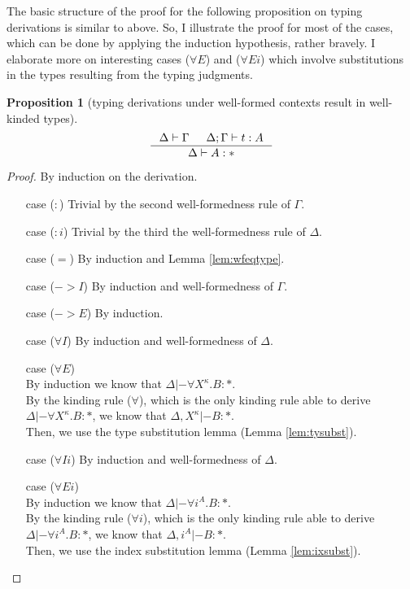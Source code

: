 \documentclass[preprint]{sigplanconf}
\theoremstyle{plain}
\newtheorem{proposition}{Proposition}
\theoremstyle{remark}
\theoremstyle{definition}
\begin{document}
The basic structure of the proof for the following proposition on typing
derivations is similar to above. So, I illustrate the proof for most of
the cases, which can be done by applying the induction hypothesis, rather
bravely. I elaborate more on interesting cases ($\forall E$) and ($\forall Ei$)
which involve substitutions in the types resulting from the typing judgments.
\begin{proposition}[typing derivations under well-formed contexts result in
	well-kinded types]
\label{prop:wftype}
\[ \inference{ \Delta |- \Gamma & \Delta;\Gamma |- t : A}{ \Delta |- A : * }
\]
\end{proposition}
\begin{proof} By induction on the derivation.
\begin{itemize}
\item[case] ($:$)
	Trivial by the second well-formedness rule of $\Gamma$.
\item[case] ($:i$)
	Trivial by the third the well-formedness rule of $\Delta$.
\item[case] ($=$)
	By induction and Lemma \ref{lem:wfeqtype}.
\item[case] ($->$$I$)
	By induction and well-formedness of $\Gamma$.
\item[case] ($->$$E$)
	By induction.
\item[case] ($\forall I$)
	By induction and well-formedness of $\Delta$.
\item[case] ($\forall E$)\\
	By induction we know that $\Delta |- \forall X^\kappa.B : *$.\\
	By the kinding rule ($\forall$), which is the only kinding rule
	able to derive $\Delta |- \forall X^\kappa.B : *$, we know
	that $\Delta,X^\kappa |- B : *$.\\
	Then, we use the type substitution lemma (Lemma \ref{lem:tysubst}).
\item[case] ($\forall Ii$)
	By induction and well-formedness of $\Delta$.
\item[case] ($\forall Ei$)\\
	By induction we know that $\Delta |- \forall i^A.B : *$.\\
	By the kinding rule ($\forall i$), which is the only kinding rule
	able to derive $\Delta |- \forall i^A.B : *$, we know
	that $\Delta,i^A |- B : *$.\\
	Then, we use the index substitution lemma (Lemma \ref{lem:ixsubst}).
\end{itemize}
\end{proof}
\end{document}
